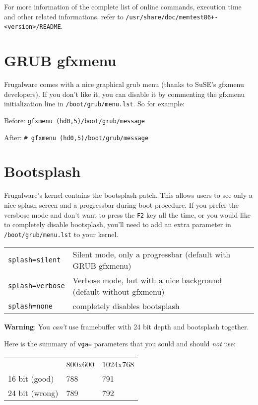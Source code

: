 For more information of the complete list of online commands, execution time and other related informations, refer to
{\tt /usr/share/doc/memtest86+-<version>/README}.

\section{GRUB gfxmenu}

Frugalware comes with a nice graphical grub menu (thanks to SuSE's gfxmenu developers). If you don't like it, you can disable it by commenting the gfxmenu initialization line in {\tt /boot/grub/menu.lst}. So for example:

Before:
{\tt gfxmenu (hd0,5)/boot/grub/message}

After:
{\tt # gfxmenu (hd0,5)/boot/grub/message}

\section{Bootsplash}

Frugalware's kernel contains the bootsplash patch. This allows users to see only a nice splash screen and a progressbar during boot procedure. If you prefer the versbose mode and don't want to press the {\tt F2} key all the time, or you would like to completely disable bootsplash, you'll need to add an extra parameter in {\tt /boot/grub/menu.lst} to your kernel.

\begin{tabular}{ll}
{\tt splash=silent} & Silent mode, only a progressbar (default with GRUB gfxmenu) \\
{\tt splash=verbose} & Verbose mode, but with a nice background (default without gfxmenu) \\
{\tt splash=none} & completely disables bootsplash \\
\end{tabular}

\textbf{Warning}: You \textit{can't} use framebuffer with 24 bit depth and bootsplash together.

Here is the summary of {\tt vga=} parameters that you sould and should \textit{not} use:

\begin{tabular}{lll}
 & 800x600 & 1024x768 \\
16 bit (good) &  788 & 791 \\
24 bit (wrong) &  789 & 792 \\
\end{tabular} 
